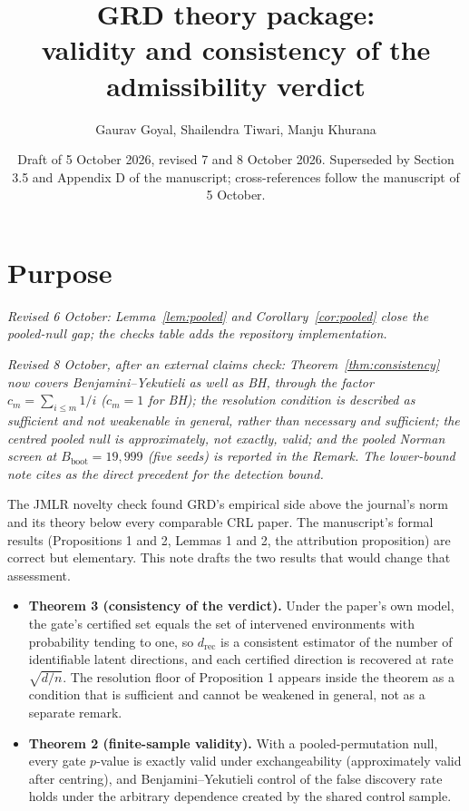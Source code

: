 \documentclass[11pt]{article}
\title{GRD theory package:\\ validity and consistency of the admissibility verdict}
\author{Gaurav Goyal, Shailendra Tiwari, Manju Khurana}
\date{Draft of 5 October 2026, revised 7 and 8 October 2026. Superseded by Section 3.5 and Appendix D of the manuscript; cross-references follow the manuscript of 5 October.}
\theoremstyle{remark}
\newcommand{\Bb}{B_{\mathrm{boot}}}
\begin{document}
\maketitle

\section*{Purpose}

\emph{Revised 6 October: Lemma~\ref{lem:pooled} and Corollary~\ref{cor:pooled} close the pooled-null gap; the checks table adds the repository implementation.}

\emph{Revised 8 October, after an external claims check: Theorem~\ref{thm:consistency} now covers Benjamini--Yekutieli as well as BH, through the factor $c_m=\sum_{i\le m}1/i$ ($c_m=1$ for BH); the resolution condition is described as sufficient and not weakenable in general, rather than necessary and sufficient; the centred pooled null is approximately, not exactly, valid; and the pooled Norman screen at $\Bb=19{,}999$ (five seeds) is reported in the Remark. The lower-bound note cites \citet{perry2018optimality} as the direct precedent for the detection bound.}


The JMLR novelty check found GRD's empirical side above the journal's norm and its theory below every comparable CRL paper. The manuscript's formal results (Propositions 1 and 2, Lemmas 1 and 2, the attribution proposition) are correct but elementary. This note drafts the two results that would change that assessment.

\begin{itemize}
  \item \textbf{Theorem 3 (consistency of the verdict).} Under the paper's own model, the gate's certified set equals the set of intervened environments with probability tending to one, so $d_{\mathrm{rec}}$ is a consistent estimator of the number of identifiable latent directions, and each certified direction is recovered at rate $\sqrt{d/n}$. The resolution floor of Proposition 1 appears inside the theorem as a condition that is sufficient and cannot be weakened in general, not as a separate remark.
  \item \textbf{Theorem 2 (finite-sample validity).} With a pooled-permutation null, every gate $p$-value is exactly valid under exchangeability (approximately valid after centring), and Benjamini--Yekutieli control of the false discovery rate holds under the arbitrary dependence created by the shared control sample.
\end{itemize}
\end{document}
